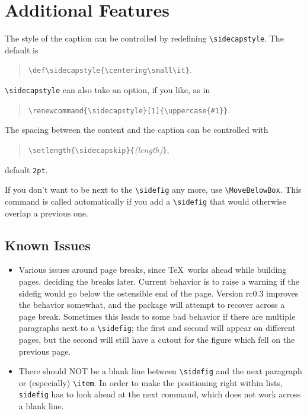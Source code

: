\documentclass{article}
\begin{document}
	
	\section*{Additional Features}

	\renewcommand{\sidecapstyle}[1]{\uppercase{#1}}
	The style of the caption can be controlled by redefining \verb|\sidecapstyle|.
	The default is
	\begin{quote}
		\verb|\def\sidecapstyle{\centering\small\it}|.
	\end{quote}
	\verb|\sidecapstyle| can also take an option, if you like, as in
	\begin{quote}
		\verb|\renewcommand{\sidecapstyle}[1]{\uppercase{#1}}|.
	\end{quote}
	
	
	The spacing between the content and the caption can be controlled with
	\begin{quote}
		\verb|\setlength{\sidecapskip}{|\emph{(length)}\verb|}|,
	\end{quote}
	default \verb|2pt|.
	
	If you don't want to be next to the \verb|\sidefig| any more, use \verb|\MoveBelowBox|.
	This command is called automatically if you add a \verb|\sidefig| that would otherwise overlap a previous one.
	
	\subsection*{Known Issues}
	
	\begin{itemize}
		\item Various issues around page breaks, since \TeX\ works ahead while building pages, deciding the breaks later.
		Current behavior is to raise a warning if the sidefig would go below the ostensible end of the page.
		Version rc0.3 improves the behavior somewhat, and the package will attempt to recover across a page break.
		Sometimes this leads to some bad behavior if there are multiple paragraphs next to a \verb|\sidefig|; the first and second will appear on different pages, but the second will still have a cutout for the figure which fell on the previous page.

		\item There should NOT be a blank line between \verb|\sidefig| and the next paragraph or (especially) \verb|\item|.
		In order to make the positioning right within lists, \verb|sidefig| has to look ahead at the next command, which does not work across a blank line.
		
	\end{itemize}
	
\end{document}
